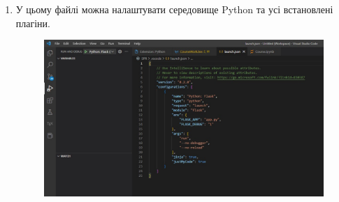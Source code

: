 \documentclass[a4paper,12pt]{article}
\begin{document}
\begin{enumerate}
\newpage
        \item У цьому файлі можна налаштувати середовище Python та усі встановлені плагіни.
        \begin{figure}[h!]
            \begin{center}
                \includegraphics[scale=0.6]{Prt sc/Figure_13.jpg}
            \end{center}
        \end{figure}
    \end{enumerate}

\newpage
\end{document}
